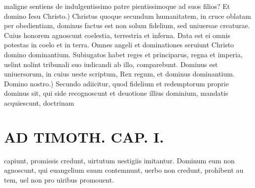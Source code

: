 \documentclass{article}
\begin{document}
\begin{pages}
maligne sentiens de indulgentissimo patre pientissimoque ad suos filios? Et domino Iesu Christo.) Christus quoque secundum humanitatem, in cruce oblatam per obedientiam, dominus factus est non solum fidelium, sed uniuersae creaturae. Cuius honorem agnoscunt coelestia, terrestria et inferna. Data est ei omnis potestas in coelo et in terra. Omnes angeli et dominationes seruiunt Christo domino dominantium. Subiugatos habet reges et principarus, regna et imperia, uelint nolint tribunali suo iudicandi ab illo, comparebunt. Dominus est uniuersorum, in cuius ueste scriptum, Rex regum, et dominus dominantium. Domino nostro.) Secundo adiicitur, quod fidelium et redemptorum proprie dominus sit, qui side recognoscunt et deuotione illius dominium, mandatis acquiescunt, doctrinam  \pend
\section*{AD TIMOTH. CAP. I. }
\marginpar{[ p.467 ]}\pstart capiunt, promissis credunt, uirtutum uestigiis imitantur. Dominum eum non agnoscunt, qui euangelium suum contemnunt, uerbo non credunt, prohibent au tem, uel non pro uiribus promouent.  \pend
{}
{}

\end{pages}
\end{document}
